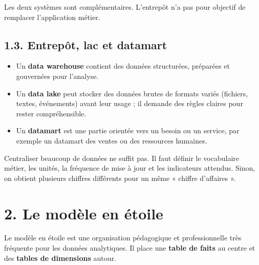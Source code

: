 \documentclass[
  french,
  letterpaper,
  open=any]{scrbook}
\providecommand{\tightlist}{%
  \setlength{\itemsep}{0pt}\setlength{\parskip}{0pt}}
\theoremstyle{definition}
\theoremstyle{definition}
\theoremstyle{remark}
\begin{document}
Les deux systèmes sont complémentaires. L'entrepôt n'a pas pour objectif
de remplacer l'application métier.

\subsection{1.3. Entrepôt, lac et
datamart}\label{entrepuxf4t-lac-et-datamart}

\begin{itemize}
\tightlist
\item
  Un \textbf{data warehouse} contient des données structurées, préparées
  et gouvernées pour l'analyse.
\item
  Un \textbf{data lake} peut stocker des données brutes de formats
  variés (fichiers, textes, événements) avant leur usage ; il demande
  des règles claires pour rester compréhensible.
\item
  Un \textbf{datamart} est une partie orientée vers un besoin ou un
  service, par exemple un datamart des ventes ou des ressources
  humaines.
\end{itemize}

\begin{tcolorbox}[enhanced jigsaw, arc=.35mm, bottomrule=.15mm, bottomtitle=1mm, breakable, colback=white, colbacktitle=quarto-callout-warning-color!10!white, colframe=quarto-callout-warning-color-frame, coltitle=black, left=2mm, leftrule=.75mm, opacityback=0, opacitybacktitle=0.6, rightrule=.15mm, title=\textcolor{quarto-callout-warning-color}{\faExclamationTriangle}\hspace{0.5em}{Un entrepôt ne corrige pas une mauvaise question}, titlerule=0mm, toprule=.15mm, toptitle=1mm]

Centraliser beaucoup de données ne suffit pas. Il faut définir le
vocabulaire métier, les unités, la fréquence de mise à jour et les
indicateurs attendus. Sinon, on obtient plusieurs chiffres différents
pour un même « chiffre d'affaires ».

\end{tcolorbox}

\section{2. Le modèle en étoile}\label{le-moduxe8le-en-uxe9toile}

Le modèle en étoile est une organisation pédagogique et professionnelle
très fréquente pour les données analytiques. Il place une \textbf{table
de faits} au centre et des \textbf{tables de dimensions} autour.
\end{document}

